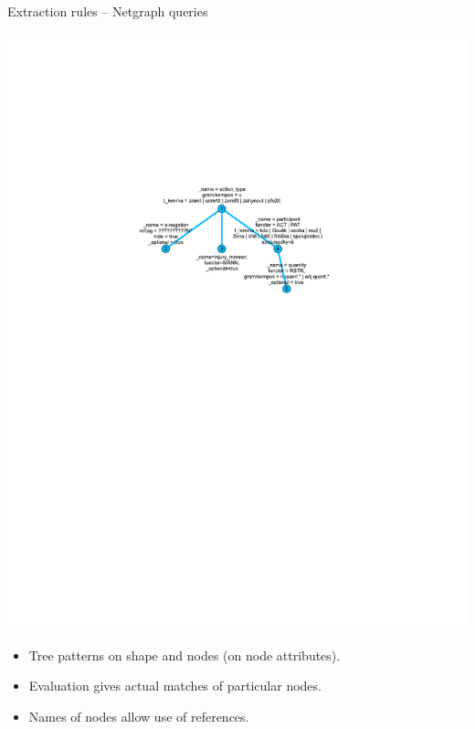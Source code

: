 \documentclass[xcolor=dvipsnames]{beamer}
\begin{document}
\begin{frame}{Extraction rules -- Netgraph queries}
\begin{center}
\includegraphics[height=0.6\vsize]{img/extract_patern}
\end{center}
\begin{itemize}
	\item Tree patterns on \alert{shape} and \alert{nodes} (on node attributes).
	\item Evaluation gives \alert{actual matches} of particular nodes.
	\item \alert{Names} of nodes allow use of references.
\end{itemize}
\end{frame}
\end{document}
